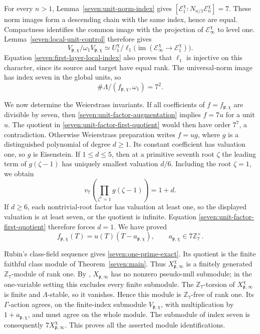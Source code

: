 \documentclass[11pt]{article}
\begin{document}
For every $n>1$, Lemma~\ref{seven:unit-norm-index} gives
$[\mathcal E_1^\chi:N_{n/1}\mathcal E_n^\chi]=7$.
These norm images form a descending chain with the same index, hence
are equal. Compactness identifies the common image with the
projection of $\mathcal E_\infty^\chi$ to level one.
Lemma~\ref{seven:local-unit-control} therefore gives
\[
 V_{\mathfrak p,\chi}/\omega_1V_{\mathfrak p,\chi}
 \simeq
 U_1^\chi/
 \ell_1\bigl(\operatorname{im}
       (\mathcal E_\infty^\chi\to\mathcal E_1^\chi)\bigr).
\]
Equation \eqref{seven:first-layer-local-index} also proves that
$\ell_1$ is injective on this character, since its source and target
have equal rank. The universal-norm image has index seven in the
global units, so
\begin{equation*}\tag{U16}\label{seven:unit-factor-first-quotient}
 \#\Lambda/(f_{\mathfrak p,\chi},\omega_1)=7^2.
\end{equation*}

We now determine the Weierstrass invariants. If all coefficients of
$f=f_{\mathfrak p,\chi}$ are divisible by seven, then
\eqref{seven:unit-factor-augmentation} implies $f=7u$ for a unit $u$.
The quotient in \eqref{seven:unit-factor-first-quotient} would then
have order $7^7$, a contradiction. Otherwise Weierstrass preparation
writes $f=ug$, where $g$ is a distinguished polynomial of degree
$d\ge1$. Its constant coefficient has valuation one, so $g$ is
Eisenstein. If $1\le d\le5$, then at a primitive seventh root
$\zeta$ the leading term of $g(\zeta-1)$ has uniquely smallest
valuation $d/6$. Including the root $\zeta=1$, we obtain
\[
 v_7\!\left(\prod_{\zeta^7=1}g(\zeta-1)\right)=1+d.
\]
If $d\ge6$, each nontrivial-root factor has valuation at least one,
so the displayed valuation is at least seven, or the quotient is
infinite. Equation \eqref{seven:unit-factor-first-quotient} therefore
forces $d=1$. We have proved
\[
 f_{\mathfrak p,\chi}(T)
 =u(T)(T-a_{\mathfrak p,\chi}),\qquad
 a_{\mathfrak p,\chi}\in7\mathbb Z_7^\times.
\]

Rubin's class-field sequence
\cite[printed p.~36, equation~(5)]{Rubin} gives
\eqref{seven:one-prime-exact}. Its quotient is the finite faithful
class module of Theorem~\ref{seven:main}. Thus
$X_{\mathfrak p,\infty}^\chi$ is a finitely generated
$\mathbb Z_7$-module of rank one.
By \cite[Theorem~5.3(v), printed pp.~40--41]{Rubin},
$X_{\mathfrak p,\infty}$ has no nonzero pseudo-null submodule;
in the one-variable setting this excludes every finite submodule.
The $\mathbb Z_7$-torsion of $X_{\mathfrak p,\infty}^\chi$ is finite
and $\Lambda$-stable, so it vanishes. Hence this module is
$\mathbb Z_7$-free of rank one. Its $\Gamma$-action agrees, on the
finite-index submodule $V_{\mathfrak p,\chi}$, with multiplication
by $1+a_{\mathfrak p,\chi}$, and must agree on the whole module.
The submodule of index seven is consequently
$7X_{\mathfrak p,\infty}^\chi$. This proves all the asserted module
identifications.
\end{document}
